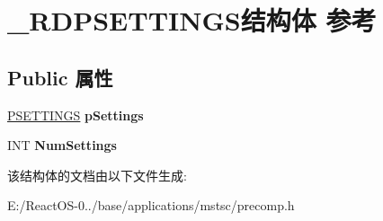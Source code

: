 \hypertarget{struct___r_d_p_s_e_t_t_i_n_g_s}{}\section{\+\_\+\+R\+D\+P\+S\+E\+T\+T\+I\+N\+G\+S结构体 参考}
\label{struct___r_d_p_s_e_t_t_i_n_g_s}
\subsection*{Public 属性}
\begin{DoxyCompactItemize}
\item 
\mbox{\label{struct___r_d_p_s_e_t_t_i_n_g_s_a002823d200e3526e9cb4bcab1f0ab7ce}} 
\hyperlink{struct___s_e_t_t_i_n_g_s}{P\+S\+E\+T\+T\+I\+N\+GS} {\bfseries p\+Settings}
\item 
\mbox{\label{struct___r_d_p_s_e_t_t_i_n_g_s_a9ab16c3fcee62e94b7910dcffb80763c}} 
I\+NT {\bfseries Num\+Settings}
\end{DoxyCompactItemize}


该结构体的文档由以下文件生成\+:\begin{DoxyCompactItemize}
\item 
E\+:/\+React\+O\+S-\/0../base/applications/mstsc/precomp.\+h\end{DoxyCompactItemize}
